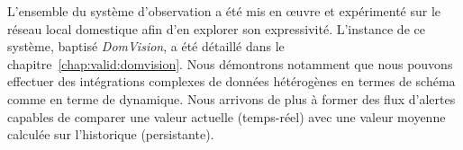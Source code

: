 L'ensemble du système d'observation a été mis en œuvre et expérimenté sur le réseau local domestique afin d'en explorer son expressivité. L'instance de ce système, baptisé \textit{DomVision}, a été détaillé dans le chapitre~\ref{chap:valid:domvision}. Nous démontrons notamment que nous pouvons effectuer des intégrations complexes de données hétérogènes en termes de schéma comme en terme de dynamique. Nous arrivons de plus à former des flux d'alertes capables de comparer une valeur actuelle (temps-réel) avec une valeur moyenne calculée sur l'historique (persistante).